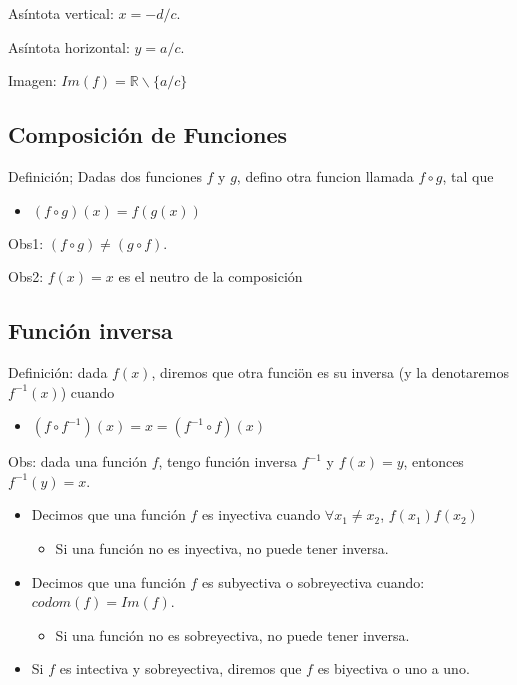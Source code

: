 \documentclass[%
 aip,
 jmp,%
 amsmath,amssymb,
 reprint,%
]{revtex4-1}
\begin{document}
Asíntota vertical: $x=-d/c$.

Asíntota horizontal: $y=a/c$.

Imagen: $Im(f)=\mathbb{R} \smallsetminus \{a/c\}$

\subsection{Composición de Funciones}

Definición; Dadas dos funciones $f$ y $g$, defino otra funcion llamada $f \circ g$, tal que \begin{itemize}
\item $(f \circ g)(x)=f(g(x))$
\end{itemize} 

Obs1: $(f \circ g) \neq (g \circ f)$.

Obs2: $f(x)=x$ es el neutro de la composición

\subsection{Función inversa}

Definición: dada $f(x)$, diremos que otra funciön es su inversa (y la denotaremos $f^{-1}(x)$) cuando 
\begin{itemize}
\item $(f \circ f^{-1})(x) = x = (f^{-1} \circ f)(x)$
\end{itemize}

Obs: dada una función $f$, tengo función inversa $f^{-1}$ y $f(x)=y$, entonces $f^{-1}(y)=x$.

\begin{itemize}
\item Decimos que una función $f$ es inyectiva cuando $\forall x_1 \neq x_2$, $f(x_1)  f(x_2)$
\begin{itemize}
\item Si una función no es inyectiva, no puede tener inversa.
\end{itemize}
\item Decimos que una función $f$ es subyectiva o sobreyectiva cuando: $codom(f)=Im(f)$.
\begin{itemize}
\item Si una función no es sobreyectiva, no puede tener inversa.
\end{itemize}
\item Si $f$ es intectiva y sobreyectiva, diremos que $f$ es biyectiva o uno a uno.
\end{itemize}
\end{document}
